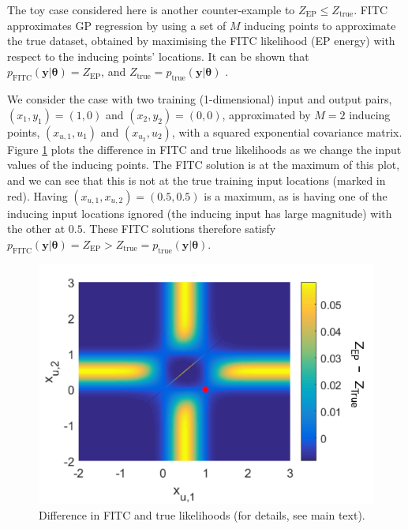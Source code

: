 \documentclass{article}
\renewcommand{\vec}[1]{\mathbf{#1}}
\begin{document}
The toy case considered here is another counter-example to $Z_\mathrm{EP} \leq Z_\mathrm{true}$. FITC approximates GP regression by using a set of $M$ inducing points to approximate the true dataset, obtained by maximising the FITC likelihood (EP energy) with respect to the inducing points’ locations. It can be shown that $p_\mathrm{FITC}(\vec{y}|\vec{\theta}) = Z_\mathrm{EP}$, and $Z_\mathrm{true} =  p_\mathrm{true}(\vec{y}|\vec{\theta})$ \citep{bui_unifying_2017}.

We consider the case with two training (1-dimensional) input and output pairs, $(x_1, y_1) = (1,0)$ and $(x_2,y_2) = (0,0)$, approximated by $M=2$ inducing points, $(x_{u,1},u_1)$ and $(x_{u_2},u_2)$, with a squared exponential covariance matrix. Figure \ref{fig:FITC} plots the difference in FITC and true likelihoods as we change the input values of the inducing points. The FITC solution is at the maximum of this plot, and we can see that this is not at the true training input locations (marked in red). Having $(x_{u,1},x_{u,2}) = (0.5,0.5)$ is a maximum, as is having one of the inducing input locations ignored (the inducing input has large magnitude) with the other at $0.5$. These FITC solutions therefore satisfy $p_\mathrm{FITC}(\vec{y}|\vec{\theta}) = Z_\mathrm{EP} > Z_\mathrm{true} =  p_\mathrm{true}(\vec{y}|\vec{\theta})$.
%
\begin{figure}[h]
  \centering
  \includegraphics[scale=0.4]{FITC_simple.png}
  \caption{Difference in FITC and true likelihoods (for details, see main text).}
  \label{fig:FITC}
\end{figure}
%
\end{document}
